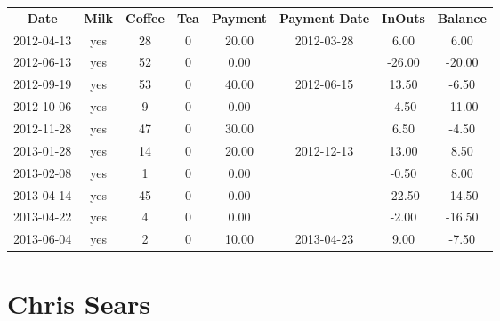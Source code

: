 \begin{center}
\begin{tabular}{cccccccc}
\textbf{Date} & \textbf{Milk} & \textbf{Coffee} & \textbf{Tea} & \textbf{Payment} & \textbf{Payment Date} & \textbf{InOuts} & \textbf{Balance} \\
2012-04-13 & yes & 28 & 0 & 20.00 & 2012-03-28 &   6.00 &   6.00\\ 
2012-06-13 & yes & 52 & 0 &  0.00 &  & -26.00 & -20.00\\ 
2012-09-19 & yes & 53 & 0 & 40.00 & 2012-06-15 &  13.50 &  -6.50\\ 
2012-10-06 & yes &  9 & 0 &  0.00 &  &  -4.50 & -11.00\\ 
2012-11-28 & yes & 47 & 0 & 30.00 &  &   6.50 &  -4.50\\ 
2013-01-28 & yes & 14 & 0 & 20.00 & 2012-12-13 &  13.00 &   8.50\\ 
2013-02-08 & yes &  1 & 0 &  0.00 &  &  -0.50 &   8.00\\ 
2013-04-14 & yes & 45 & 0 &  0.00 &  & -22.50 & -14.50\\ 
2013-04-22 & yes &  4 & 0 &  0.00 &  &  -2.00 & -16.50\\ 
2013-06-04 & yes &  2 & 0 & 10.00 & 2013-04-23 &   9.00 &  -7.50
\end{tabular}
\end{center}

\section{Chris Sears}

